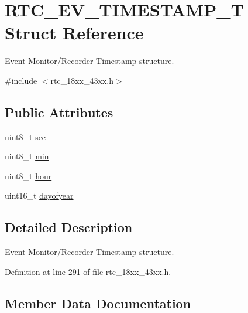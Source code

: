 \hypertarget{struct_r_t_c___e_v___t_i_m_e_s_t_a_m_p___t}{}\section{R\+T\+C\+\_\+\+E\+V\+\_\+\+T\+I\+M\+E\+S\+T\+A\+M\+P\+\_\+T Struct Reference}
\label{struct_r_t_c___e_v___t_i_m_e_s_t_a_m_p___t}


Event Monitor/\+Recorder Timestamp structure.  




{\ttfamily \#include $<$rtc\+\_\+18xx\+\_\+43xx.\+h$>$}

\subsection*{Public Attributes}
\begin{DoxyCompactItemize}
\item 
uint8\+\_\+t \hyperlink{struct_r_t_c___e_v___t_i_m_e_s_t_a_m_p___t_ad3e081e55d4388aa97287698d6a57cbc}{sec}
\item 
uint8\+\_\+t \hyperlink{struct_r_t_c___e_v___t_i_m_e_s_t_a_m_p___t_af19e1239e849cb6d0365f5f757112608}{min}
\item 
uint8\+\_\+t \hyperlink{struct_r_t_c___e_v___t_i_m_e_s_t_a_m_p___t_ade5e11feff4ee80cf09598d675fe16f0}{hour}
\item 
uint16\+\_\+t \hyperlink{struct_r_t_c___e_v___t_i_m_e_s_t_a_m_p___t_abcdd17e2665e1c39cf7ddf9a3b13de35}{dayofyear}
\end{DoxyCompactItemize}


\subsection{Detailed Description}
Event Monitor/\+Recorder Timestamp structure. 

Definition at line 291 of file rtc\+\_\+18xx\+\_\+43xx.\+h.



\subsection{Member Data Documentation}
\mbox{\label{struct_r_t_c___e_v___t_i_m_e_s_t_a_m_p___t_abcdd17e2665e1c39cf7ddf9a3b13de35}} 
